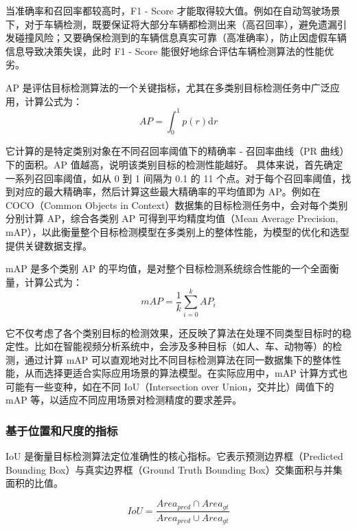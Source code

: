 当准确率和召回率都较高时，F1 - Score 才能取得较大值。例如在自动驾驶场景下，对于车辆检测，既要保证将大部分车辆都检测出来（高召回率），避免遗漏引发碰撞风险；又要确保检测到的车辆信息真实可靠（高准确率），防止因虚假车辆信息导致决策失误，此时 F1 - Score 能很好地综合评估车辆检测算法的性能优劣。

AP 是评估目标检测算法的一个关键指标，尤其在多类别目标检测任务中广泛应用，计算公式为：
\begin{equation}
    \label{eq:AP}
    AP=\int_{0}^{1}p(r)\mathrm{d}r
\end{equation}

它计算的是特定类别对象在不同召回率阈值下的精确率 - 召回率曲线（PR 曲线）下的面积。AP 值越高，说明该类别目标的检测性能越好。
具体来说，首先确定一系列召回率阈值，如从 0 到 1 间隔为 0.1 的 11 个点。对于每个召回率阈值，找到对应的最大精确率，然后计算这些最大精确率的平均值即为 AP。例如在 COCO（Common Objects in Context）数据集的目标检测任务中，会对每个类别分别计算 AP，综合各类别 AP 可得到平均精度均值（Mean Average Precision, mAP），以此衡量整个目标检测模型在多类别上的整体性能，为模型的优化和选型提供关键数据支撑。

mAP 是多个类别 AP 的平均值，是对整个目标检测系统综合性能的一个全面衡量，计算公式为：
\begin{equation}
    \label{eq:mAP}
    mAP=\frac{1}{k}\textstyle \sum_{i=0}^{k}AP_i 
\end{equation}

它不仅考虑了各个类别目标的检测效果，还反映了算法在处理不同类型目标时的稳定性。比如在智能视频分析系统中，会涉及多种目标（如人、车、动物等）的检测，通过计算 mAP 可以直观地对比不同目标检测算法在同一数据集下的整体性能，从而选择更适合实际应用场景的算法模型。在实际应用中，mAP 计算方式也可能有一些变种，如在不同 IoU（Intersection over Union，交并比）阈值下的 mAP 等，以适应不同应用场景对检测精度的要求差异。


\subsubsection{基于位置和尺度的指标}

IoU 是衡量目标检测算法定位准确性的核心指标。它表示预测边界框（Predicted Bounding Box）与真实边界框（Ground Truth Bounding Box）交集面积与并集面积的比值。

\begin{equation}
    \label{eq:iou}
    IoU = \frac{Area_{pred} \cap Area_{gt}}{Area_{pred} \cup Area_{gt}}
\end{equation}

